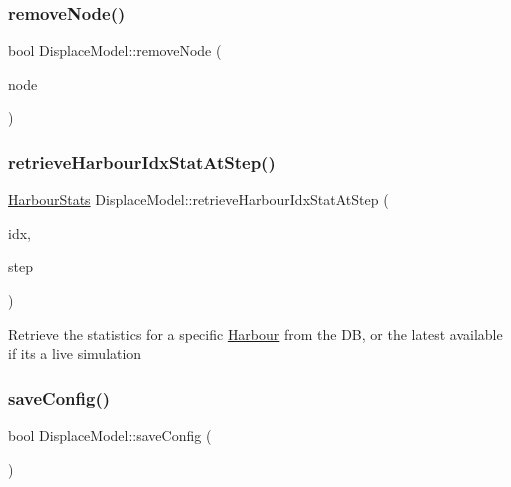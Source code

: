 \mbox{\label{class_displace_model_afab2c55ceae81433a9d6a1f72caaf202}} 
\subsubsection{\texorpdfstring{removeNode()}{removeNode()}}
{\footnotesize\ttfamily bool Displace\+Model\+::remove\+Node (\begin{DoxyParamCaption}\item[{std\+::shared\+\_\+ptr$<$ \mbox{\hyperlink{class_node_data}{Node\+Data}} $>$}]{node }\end{DoxyParamCaption})}

\mbox{\label{class_displace_model_afc1482f47afe0fd6e7a02219b86789db}} 
\subsubsection{\texorpdfstring{retrieveHarbourIdxStatAtStep()}{retrieveHarbourIdxStatAtStep()}}
{\footnotesize\ttfamily \mbox{\hyperlink{class_harbour_stats}{Harbour\+Stats}} Displace\+Model\+::retrieve\+Harbour\+Idx\+Stat\+At\+Step (\begin{DoxyParamCaption}\item[{int}]{idx,  }\item[{int}]{step }\end{DoxyParamCaption})}

Retrieve the statistics for a specific \mbox{\hyperlink{class_harbour}{Harbour}} from the DB, or the latest available if it\textquotesingle{}s a live simulation \mbox{\label{class_displace_model_af9886ee44c007660e246b9e289f1fb20}} 
\subsubsection{\texorpdfstring{saveConfig()}{saveConfig()}}
{\footnotesize\ttfamily bool Displace\+Model\+::save\+Config (\begin{DoxyParamCaption}{ }\end{DoxyParamCaption})}

